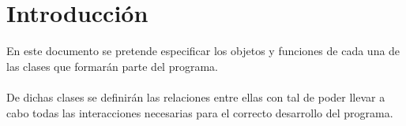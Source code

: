 \section{Introducción}\label{sec:intro}

En este documento se pretende especificar los objetos y funciones de cada una de las clases que formarán parte del programa.
\\
\\De dichas clases se definirán las relaciones entre ellas con tal de poder llevar a cabo todas las interacciones necesarias para el correcto desarrollo del programa.

